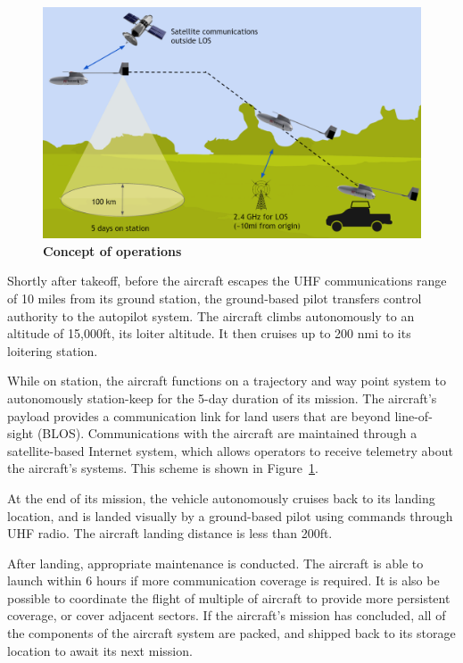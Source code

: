 \documentclass[journal]{aiaa-tc}%
\begin{document}
\begin{figure}[h!]
    \begin{center}
    \includegraphics[width = .75\textwidth]{conops}
     \caption{ \textbf{Concept of operations} }
    \label{f:conops}
    \end{center}
\end{figure}

Shortly after takeoff, before the aircraft escapes the UHF communications range of 10 miles from its ground station, the ground-based pilot transfers control authority to the autopilot system. The aircraft climbs autonomously to an altitude of 15,000ft, its loiter altitude. It then cruises up to 200 nmi to its loitering station. 

While on station, the aircraft functions on a trajectory and way point system to autonomously station-keep for the 5-day duration of its mission. The aircraft's payload provides a communication link for land users that are beyond line-of-sight (BLOS).  Communications with the aircraft are maintained through a satellite-based Internet system, which allows operators to receive telemetry about the aircraft's systems. This scheme is shown in Figure~\ref{f:conops}.

At the end of its mission, the vehicle autonomously cruises back to its landing location, and is landed visually by a ground-based pilot using commands through UHF radio. The aircraft landing distance is less than 200ft.

After landing, appropriate maintenance is conducted. The aircraft is able to launch within 6 hours if more communication coverage is required. It is also be possible to coordinate the flight of multiple of aircraft to provide more persistent coverage, or cover adjacent sectors. If the aircraft's mission has concluded, all of the components of the aircraft system are packed, and shipped back to its storage location to await its next mission. 
\end{document}
